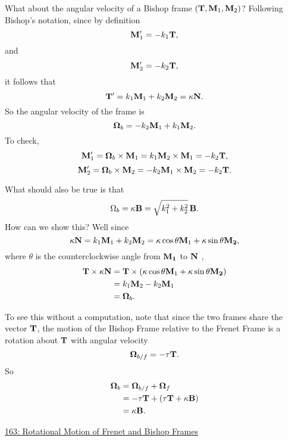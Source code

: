 \documentclass{ximera}
\begin{document}
What about the angular velocity of a Bishop frame $({\bf T}, {\bf M}_1, {\bf M}_2)$? Following Bishop's notation, since by definition
\[
     {\bf M}_1^\prime = -k_1 {\bf T} , 
\]
and
\[
   {\bf M}_2^\prime = -k_2 {\bf T} , 
\]
it follows that
\[
   {\bf T}^\prime  = k_1 {\bf M}_1 + k_2 {\bf M}_2 = \kappa {\bf N} .
\]
So the angular velocity of the frame is
\[
  \boldsymbol{\Omega}_b = -k_2 {\bf M}_1 + k_1{\bf M}_2 .
\]
To check,
\[
    {\bf M}_1^\prime = \boldsymbol{\Omega}_b \times {\bf M}_1 = k_1 {\bf M}_2 \times {\bf M}_1 = - k_2 {\bf T} ,
\]
\[
    {\bf M}_2^\prime = \boldsymbol{\Omega}_b \times {\bf M}_2 = -k_2 {\bf M}_1 \times {\bf M}_2 = - k_2 {\bf T}.
\]

What should also be true is that
\[
        \Omega_b = \kappa {\bf B} = \sqrt{k_1^2 + k_2^2} \, {\bf B} .
\]
How can we show this? Well since
\[
   \kappa {\bf N} =  k_1 {\bf M}_1 + k_2 {\bf M}_2 = \kappa \cos \theta {\bf M}_1 + \kappa \sin\theta {\bf M_2} ,
\]
where $\theta$ is the counterclockwise angle from ${\bf M_1}$ to ${\bf N}$ ,
\begin{align*}
     {\bf T}\times \kappa {\bf N} &= {\bf T} \times  (  \kappa \cos \theta {\bf M}_1 + \kappa \sin\theta {\bf M_2}   ) \\
                                   &= k_1 {\bf M}_2 - k_2 {\bf M}_1 \\
                                   &= \boldsymbol{\Omega}_b.
\end{align*}

To see this without a computation, note that since the two frames share the vector ${\bf T}$, the motion of the Bishop Frame relative to the Frenet Frame is a rotation about ${\bf T}$ with angular velocity
\[
      \boldsymbol{\Omega}_{b/f} = -\tau {\bf T}.
\]
So
\begin{align*}
        \boldsymbol{\Omega}_{b} &= \boldsymbol{\Omega}_{b/f}  + \boldsymbol{\Omega}_f   \\
                                                &=     -\tau {\bf T} + (\tau {\bf T} + \kappa {\bf B})  \\
                                                &= \kappa {\bf B} .        
\end{align*}


\begin{exploration}
\begin{onlineOnly}
    \begin{center}
\end{center}
\end{onlineOnly}

\href{https://www.desmos.com/3d/4cjlddpmwd}{163: Rotational Motion of Frenet and Bishop Frames}
\end{exploration}
\end{document}
